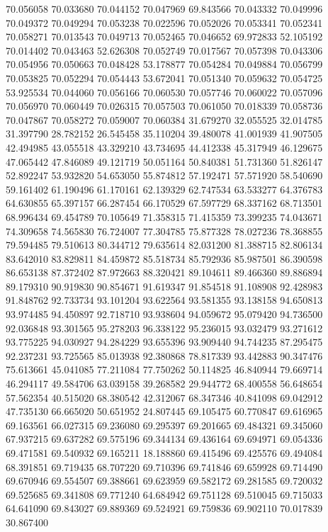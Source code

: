 70.056058
70.033680
70.044152
70.047969
69.843566
70.043332
70.049996
70.049372
70.049294
70.053238
70.022596
70.052026
70.053341
70.052341
70.058271
70.013543
70.049713
70.052465
70.046652
69.972833
52.105192
70.014402
70.043463
52.626308
70.052749
70.017567
70.057398
70.043306
70.054956
70.050663
70.048428
53.178877
70.054284
70.049884
70.056799
70.053825
70.052294
70.054443
53.672041
70.051340
70.059632
70.054725
53.925534
70.044060
70.056166
70.060530
70.057746
70.060022
70.057096
70.056970
70.060449
70.026315
70.057503
70.061050
70.018339
70.058736
70.047867
70.058272
70.059007
70.060384
31.679270
32.055525
32.014785
31.397790
28.782152
26.545458
35.110204
39.480078
41.001939
41.907505
42.494985
43.055518
43.329210
43.734695
44.412338
45.317949
46.129675
47.065442
47.846089
49.121719
50.051164
50.840381
51.731360
51.826147
52.892247
53.932820
54.653050
55.874812
57.192471
57.571920
58.540690
59.161402
61.190496
61.170161
62.139329
62.747534
63.533277
64.376783
64.630855
65.397157
66.287454
66.170529
67.597729
68.337162
68.713501
68.996434
69.454789
70.105649
71.358315
71.415359
73.399235
74.043671
74.309658
74.565830
76.724007
77.304785
75.877328
78.027236
78.368855
79.594485
79.510613
80.344712
79.635614
82.031200
81.388715
82.806134
83.642010
83.829811
84.459872
85.518734
85.792936
85.987501
86.390598
86.653138
87.372402
87.972663
88.320421
89.104611
89.466360
89.886894
89.179310
90.919830
90.854671
91.619347
91.854518
91.108908
92.428983
91.848762
92.733734
93.101204
93.622564
93.581355
93.138158
94.650813
93.974485
94.450897
92.718710
93.938604
94.059672
95.079420
94.736500
92.036848
93.301565
95.278203
96.338122
95.236015
93.032479
93.271612
93.775225
94.030927
94.284229
93.655396
93.909440
94.744235
87.295475
92.237231
93.725565
85.013938
92.380868
78.817339
93.442883
90.347476
75.613661
45.041085
77.211084
77.750262
50.114825
46.840944
79.669714
46.294117
49.584706
63.039158
39.268582
29.944772
68.400558
56.648654
57.562354
40.515020
68.380542
42.312067
68.347346
40.841098
69.042912
47.735130
66.665020
50.651952
24.807445
69.105475
60.770847
69.616965
69.163561
66.027315
69.236080
69.295397
69.201665
69.484321
69.345060
67.937215
69.637282
69.575196
69.344134
69.436164
69.694971
69.054336
69.471581
69.540932
69.165211
18.188860
69.415496
69.425576
69.494084
68.391851
69.719435
68.707220
69.710396
69.741846
69.659928
69.714490
69.670946
69.554507
69.388661
69.623959
69.582172
69.281585
69.720032
69.525685
69.341808
69.771240
64.684942
69.751128
69.510045
69.715033
64.641090
69.843027
69.889369
69.524921
69.759836
69.902110
70.017839
30.867400
